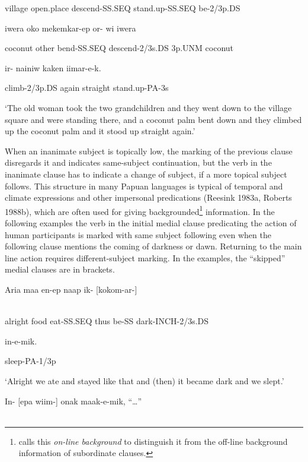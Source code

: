 village  open.place  descend-SS.SEQ  stand.up-SS.SEQ  be-2/3p.DS

iwera  oko  mekemkar-ep  or-  wi  iwera

coconut  other  bend-SS.SEQ  descend-2/3s.DS  3p.UNM  coconut

ir-  nainiw  kaken  iimar-e-k.

climb-2/3p.DS  again  straight  stand.up-PA-3s

`The old woman took the two grandchildren and they went down to the village square and were standing there, and a coconut palm bent down and they climbed up the coconut palm and it stood up straight again.'

When an inanimate subject is topically low, the  marking of the previous clause disregards it and indicates same-subject continuation, but the verb in the inanimate clause has to indicate a change of subject, if a more topical subject follows. This structure in many Papuan languages is typical of temporal and climate expressions and other impersonal predications (Reesink 1983a, Roberts 1988b), which are often used for giving backgrounded\footnote{\citet[244]{Farr1999} calls this \textit{on-line background} to distinguish it from the off-line background information of subordinate clauses.} information. In the following examples the verb in the initial medial clause predicating the action of human participants is marked with same subject following even when the following clause mentions the coming of darkness or dawn. Returning to the main line action requires different-subject marking. In the examples, the ``skipped'' medial clauses are in brackets.

\ea%
\label{ex:x1482}
\gll Aria  maa  en-ep  naap  ik-  [kokom-ar-] \\
      \\
\glt
\z

alright  food  eat-SS.SEQ  thus  be-SS  dark-INCH-2/3s.DS

in-e-mik.

sleep-PA-1/3p

`Alright we ate and stayed like that and (then) it became dark and we slept.'

\ea%
\label{ex:x1475}
\gll In-  [epa  wiim-]  onak  maak-e-mik,  ``{\dots''} \\
      \\
\glt
\z

